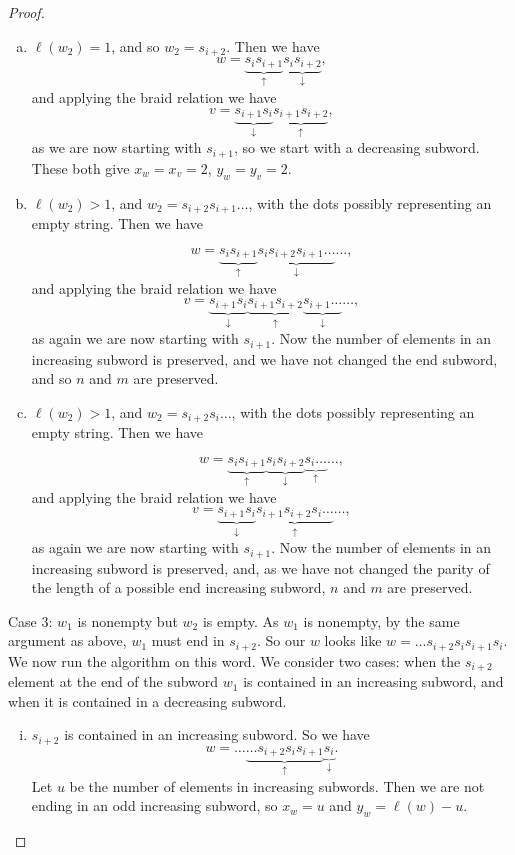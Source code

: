 \documentclass[10pt,a4paper]{amsart}
\begin{document}
\begin{proof}
    \begin{enumerate}[(a)]
        \item $\ell(w_2)=1$, and so $w_2=s_{i+2}$. Then we have
        \[w=\underbrace{s_is_{i+1}}_\uparrow \underbrace{s_is_{i+2}}_\downarrow,\]
        and applying the braid relation we have
        \[v=\underbrace{s_{i+1}s_i}_\downarrow \underbrace{s_{i+1}s_{i+2}}_\uparrow,\]
        as we are now starting with $s_{i+1}$, so we start with a decreasing subword. These both give $x_w=x_v=2$, $y_w=y_v=2$. 
        
        \item $\ell(w_2)>1$, and $w_2=s_{i+2}s_{i+1}\hdots$, with the dots possibly representing an empty string. Then we have
        
        \[w=\underbrace{s_is_{i+1}}_\uparrow \underbrace{s_is_{i+2}s_{i+1}\hdots}_\downarrow\hdots,\]
        and applying the braid relation we have
        \[v=\underbrace{s_{i+1}s_i}_\downarrow \underbrace{s_{i+1}s_{i+2}}_\uparrow\underbrace{s_{i+1}\hdots}_\downarrow\hdots,\]
        as again we are now starting with $s_{i+1}$. Now the number of elements in an increasing subword is preserved, and we have not changed the end subword, and so $n$ and $m$ are preserved.
        \item $\ell(w_2)>1$, and $w_2=s_{i+2}s_i\hdots$, with the dots possibly representing an empty string. Then we have
        
        \[w=\underbrace{s_is_{i+1}}_\uparrow \underbrace{s_is_{i+2}}_\downarrow\underbrace{s_i\hdots}_\uparrow\hdots,\]
        and applying the braid relation we have
        \[v=\underbrace{s_{i+1}s_i}_\downarrow \underbrace{s_{i+1}s_{i+2}s_i\hdots}_\uparrow\hdots,\]
        as again we are now starting with $s_{i+1}$. Now the number of elements in an increasing subword is preserved, and, as we have not changed the parity of the length of a possible end increasing subword, $n$ and $m$ are preserved.
    \end{enumerate}
    Case 3: $w_1$ is nonempty but $w_2$ is empty. As $w_1$ is nonempty,  by the same argument as above, $w_1$ must end in $s_{i+2}$. So our $w$ looks like $w=\hdots s_{i+2}s_is_{i+1}s_i$. We now run the algorithm on this word. We consider two cases: when the $s_{i+2}$ element at the end of the subword $w_1$ is contained in an increasing subword, and when it is contained in a decreasing subword. 
\begin{enumerate}[(i)]
        \item $s_{i+2}$ is contained in an increasing subword. So we have
    \[w=\hdots\underbrace{\hdots s_{i+2}s_is_{i+1}}_\uparrow \underbrace{s_i}_\downarrow.\]
    Let $u$ be the number of elements in increasing subwords. Then we are not ending in an odd increasing subword, so $x_w=u$ and $y_w=\ell(w)-u$.
    

\end{enumerate}
\end{proof}
\end{document}
